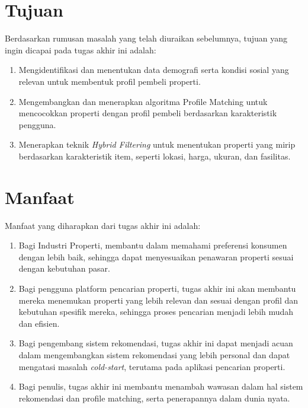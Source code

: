 \section{Tujuan}
\label{sec:Tujuan}

Berdasarkan rumusan masalah yang telah diuraikan sebelumnya, tujuan yang ingin dicapai pada tugas akhir ini adalah:

\begin{enumerate}

  \item Mengidentifikasi dan menentukan data demografi serta kondisi sosial yang relevan untuk membentuk profil pembeli properti.

  \item Mengembangkan dan menerapkan algoritma Profile Matching untuk mencocokkan properti dengan profil pembeli berdasarkan karakteristik pengguna.
  
  \item Menerapkan teknik \emph{Hybrid Filtering} untuk menentukan properti yang mirip berdasarkan karakteristik item, seperti lokasi, harga, ukuran, dan fasilitas.
  
\end{enumerate}

\section{Manfaat}
\label{sec:Manfaat}

Manfaat yang diharapkan dari tugas akhir ini adalah:

\begin{enumerate}

  \item Bagi Industri Properti, membantu dalam memahami preferensi konsumen dengan lebih baik, sehingga dapat menyesuaikan penawaran properti sesuai dengan kebutuhan pasar.

  \item Bagi pengguna platform pencarian properti, tugas akhir ini akan membantu mereka menemukan properti yang lebih relevan dan sesuai dengan profil dan kebutuhan spesifik mereka, sehingga proses pencarian menjadi lebih mudah dan efisien.

  \item Bagi pengembang sistem rekomendasi, tugas akhir ini dapat menjadi acuan dalam mengembangkan sistem rekomendasi yang lebih personal dan dapat mengatasi masalah \emph{cold-start}, terutama pada aplikasi pencarian properti.

  \item Bagi penulis, tugas akhir ini membantu menambah wawasan dalam hal sistem rekomendasi dan profile matching, serta penerapannya dalam dunia nyata.

\end{enumerate}

